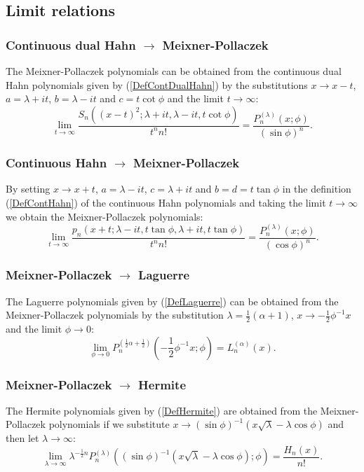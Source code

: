 \documentclass[envcountchap,graybox]{svmono}
\newcounter{rom}
\begin{document}
\subsection*{Limit relations}

\subsubsection*{Continuous dual Hahn $\rightarrow$ Meixner-Pollaczek}
The Meixner-Pollaczek polynomials can be obtained from the continuous dual Hahn polynomials
given by (\ref{DefContDualHahn}) by the substitutions $x\rightarrow x-t$, $a=\lambda+it$,
$b=\lambda-it$ and $c=t\cot\phi$ and the limit $t\rightarrow\infty$:
$$\lim_{t\rightarrow\infty}\frac{S_n((x-t)^2;\lambda+it,\lambda-it,t\cot\phi)}{t^nn!}
=\frac{P_n^{(\lambda)}(x;\phi)}{(\sin\phi)^n}.$$

\subsubsection*{Continuous Hahn $\rightarrow$ Meixner-Pollaczek}
By setting $x\rightarrow x+t$, $a=\lambda-it$, $c=\lambda+it$ and $b=d=t\tan\phi$ in the
definition (\ref{DefContHahn}) of the continuous Hahn polynomials and taking the limit
$t\rightarrow\infty$ we obtain the Meixner-Pollaczek polynomials:
$$\lim_{t\rightarrow\infty}\frac{p_n(x+t;\lambda-it,t\tan\phi,\lambda+it,t\tan\phi)}{t^nn!}
=\frac{P_n^{(\lambda)}(x;\phi)}{(\cos\phi)^n}.$$

\newpage

\subsubsection*{Meixner-Pollaczek $\rightarrow$ Laguerre}
The Laguerre polynomials given by (\ref{DefLaguerre}) can be obtained from the
Meixner-Pollaczek polynomials by the substitution $\lambda=\frac{1}{2}(\alpha+1)$,
$x\rightarrow -\frac{1}{2}\phi^{-1}x$ and the limit $\phi\rightarrow 0$:
\begin{equation}
\lim_{\phi\rightarrow 0}
P_n^{(\frac{1}{2}\alpha+\frac{1}{2})}(-\textstyle\frac{1}{2}\phi^{-1}x;\phi)=L_n^{(\alpha)}(x).
\end{equation}

\subsubsection*{Meixner-Pollaczek $\rightarrow$ Hermite}
The Hermite polynomials given by (\ref{DefHermite}) are obtained from the Meixner-Pollaczek
polynomials if we substitute $x\rightarrow (\sin\phi)^{-1}(x\sqrt{\lambda}-\lambda\cos\phi)$
and then let $\lambda\rightarrow\infty$:
\begin{equation}
\lim_{\lambda\rightarrow\infty}
\lambda^{-\frac{1}{2}n}P_n^{(\lambda)}
((\sin\phi)^{-1}(x\sqrt{\lambda}-\lambda\cos\phi);\phi)=\frac{H_n(x)}{n!}.
\end{equation}
\end{document}
